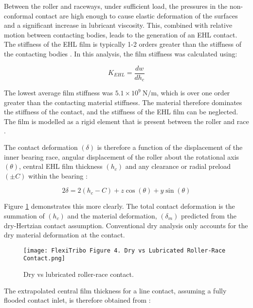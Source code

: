 Between the roller and raceways, under sufficient load, the pressures in the non-conformal contact are high enough to cause elastic deformation of the surfaces and a significant increase in lubricant viscosity. This, combined with relative motion between contacting bodies, leads to the generation of an EHL contact. The stiffness of the EHL film is typically 1-2 orders greater than the stiffness of the contacting bodies \cite{Dietl1997}. In this analysis, the film stiffness was calculated using:

\begin{equation}\label{Film stiffness}
	K_{E H L}=\frac{d w}{d h_c}
\end{equation}

The lowest average film stiffness was $5.1 \times 10^9 \mathrm{~N} / \mathrm{m}$, which is over one order greater than the contacting material stiffness. The material therefore dominates the stiffness of the contact, and the stiffness of the EHL film can be neglected. The film is modelled as a rigid element that is present between the roller and race \cite{Walford1983} \cite{Dareing1975} \cite{Mehdigoli1990}.

The contact deformation $(\delta)$ is therefore a function of the displacement of the inner bearing race, angular displacement of the roller about the rotational axis $(\theta)$, central EHL film thickness $\left(h_c\right)$ and any clearance or radial preload $( \pm C)$ within the bearing \cite{Rahnejat1985} \cite{Mohammadpour2015c}:

\begin{equation}\label{Contact deformation flextribo}
	2 \delta=2\left(h_c-C\right)+z \cos (\theta)+y \sin (\theta)
\end{equation}

Figure \ref{Dry vs lubricated roller-race contact} demonstrates this more clearly. The total contact deformation is the summation of $\left(h_c\right)$ and the material deformation, $\left(\delta_m\right)$ predicted from the dry-Hertzian contact assumption. Conventional dry analysis only accounts for the dry material deformation at the contact.

\begin{figure}
	\centering  
	\texttt{[image: FlexiTribo Figure 4. Dry vs Lubricated Roller-Race Contact.png]}
	\caption{Dry vs lubricated roller-race contact.}
	\label{Dry vs lubricated roller-race contact}
\end{figure} 

The extrapolated central film thickness for a line contact, assuming a fully flooded contact inlet, is therefore obtained from \cite{Dowson1979}: 


